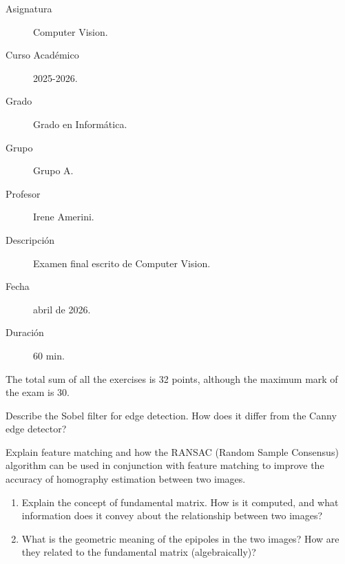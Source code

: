 \documentclass[12pt]{article}
\begin{document}

    
	

    \begin{description}
        \item[Asignatura] Computer Vision.
        \item[Curso Académico] 2025-2026.
        \item[Grado] Grado en Informática.
        \item[Grupo] Grupo A.
        \item[Profesor] Irene Amerini.
        \item[Descripción] Examen final escrito de Computer Vision.
        \item[Fecha] abril de 2026.
        \item[Duración] 60 min.
    
    \end{description}
    \newpage


    \begin{observacion}
        The total sum of all the exercises is 32 points, although the maximum mark of the exam is 30.
    \end{observacion}
    
   \begin{ejercicio}[8 points]
    Describe the Sobel filter for edge detection. How does it differ from the Canny edge detector?
    \end{ejercicio}

    \begin{ejercicio}[8 points]
        Explain feature matching and how the RANSAC (Random Sample Consensus) algorithm can be used in conjunction with feature matching to improve the accuracy of homography estimation between two images.
    \end{ejercicio}

    \begin{ejercicio}[8 points]
        \begin{enumerate}
            \item[a.] Explain the concept of fundamental matrix. How is it computed, and what information does it convey about the relationship between two images?
            \item[b.] What is the geometric meaning of the epipoles in the two images? How are they related to the fundamental matrix (algebraically)?
        \end{enumerate}
    \end{ejercicio}
\end{document}
